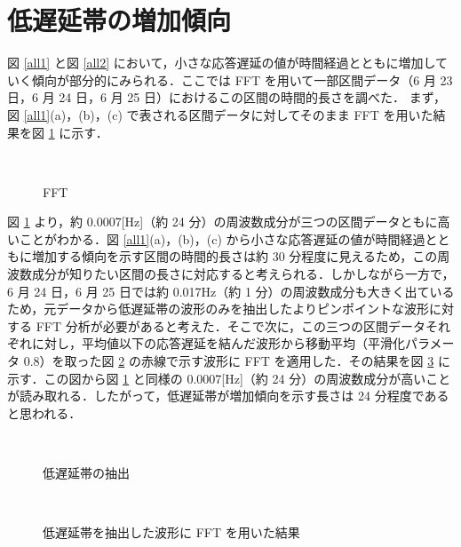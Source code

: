 \documentclass[a4j]{jarticle}
\begin{document}
\section{低遅延帯の増加傾向}
図 \ref{all1} と図 \ref{all2} において，小さな応答遅延の値が時間経過とともに増加していく傾向が部分的にみられる．ここでは FFT を用いて一部区間データ（6 月 23 日，6 月 24 日，6 月 25 日）におけるこの区間の時間的長さを調べた．
まず，図 \ref{all1}(a)，(b)，(c) で表される区間データに対してそのまま FFT を用いた結果を図 \ref{fft} に示す．
\begin{figure}[tb]
\begin{center}
~
~
\caption{FFT}
\label{fft}
\end{center}
\end{figure}
図 \ref{fft} より，約 0.0007[Hz]（約 24 分）の周波数成分が三つの区間データともに高いことがわかる．図 \ref{all1}(a)，(b)，(c) から小さな応答遅延の値が時間経過とともに増加する傾向を示す区間の時間的長さは約 30 分程度に見えるため，この周波数成分が知りたい区間の長さに対応すると考えられる．しかしながら一方で，6 月 24 日，6 月 25 日では約 0.017Hz（約 1 分）の周波数成分も大きく出ているため，元データから低遅延帯の波形のみを抽出したよりピンポイントな波形に対する FFT 分析が必要があると考えた．そこで次に，この三つの区間データそれぞれに対し，平均値以下の応答遅延を結んだ波形から移動平均（平滑化パラメータ 0.8）を取った図 \ref{low} の赤線で示す波形に FFT を適用した．その結果を図 \ref{lowfft} に示す．この図から図 \ref{fft} と同様の 0.0007[Hz]（約 24 分）の周波数成分が高いことが読み取れる．したがって，低遅延帯が増加傾向を示す長さは 24 分程度であると思われる．
\begin{figure}[tb]
\begin{center}
~
\\
\caption{低遅延帯の抽出}
\label{low}
\end{center}
\end{figure}
\begin{figure}[tb]
\begin{center}
~
~
\caption{低遅延帯を抽出した波形に FFT を用いた結果}
\label{lowfft}
\end{center}
\end{figure}
\end{document}
